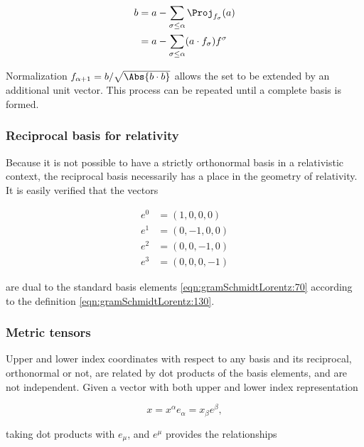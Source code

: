 \begin{equation}\label{eqn:gramSchmidtLorentz:660}
\begin{aligned}
b
&= a - \sum_{\sigma \le \alpha} \Proj_{f_\sigma}(a) \\
&= a - \sum_{\sigma \le \alpha} (a \cdot f_\sigma) f^\sigma
\end{aligned}
\end{equation}

Normalization $f_{\alpha+1} = b/\sqrt{\Abs{b \cdot b}}$ allows the set to be extended by an additional unit vector.  This process can be repeated until a complete basis is formed.

\subsubsection{Reciprocal basis for relativity}

Because it is not possible to have a strictly orthonormal basis in a relativistic context, the reciprocal basis necessarily has a place in the geometry of relativity.
It is easily verified that the vectors

\begin{equation}\label{eqn:gramSchmidtLorentz:70b}
\begin{aligned}
e^0 &= (1, 0, 0, 0) \\
e^1 &= (0, -1, 0, 0) \\
e^2 &= (0, 0, -1, 0) \\
e^3 &= (0, 0, 0, -1)
\end{aligned}
\end{equation}

are dual to the standard basis elements \ref{eqn:gramSchmidtLorentz:70} according to the definition \ref{eqn:gramSchmidtLorentz:130}.

\subsubsection{Metric tensors}

Upper and lower index coordinates with respect to any basis and its reciprocal, orthonormal or not, are related by dot products of the basis elements, and are not independent.  Given a vector with both upper and lower index representation

\begin{equation}\label{eqn:gramSchmidtLorentz:980}
x = x^\alpha e_\alpha = x_\beta e^\beta,
\end{equation}

taking dot products with $e_\mu$, and $e^\mu$ provides the relationships

